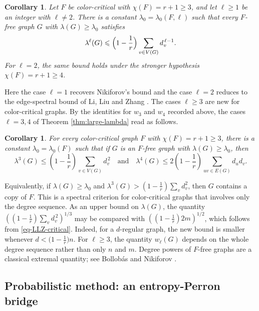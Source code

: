 \documentclass[11pt, a4paper]{article}
\newtheorem{corollary}[theorem]{Corollary}
\theoremstyle{definition}
\theoremstyle{plain}
\renewcommand{\le}{\leqslant}
\renewcommand{\ge}{\geqslant}
\begin{document}
\begin{corollary} \label{coro-spectral-power}
Let $F$ be color-critical with
$\chi (F)=r+1\ge 3$, and let $\ell \ge 1$ be an
integer with $\ell \ne 2$. There is a constant
$\lambda_0=\lambda_0(F,\ell )$ such that every
$F$-free graph $G$ with $\lambda (G)\ge \lambda_0$
satisfies
\[
  \lambda^\ell (G)\le \Bigl(1-\frac{1}{r}\Bigr)
  \sum_{v\in V(G)}d_v^{\,\ell -1}.
\]
 For $\ell =2$, the same bound holds under 
 the stronger hypothesis $\chi (F)=r+1\ge 4$.
\end{corollary}


Here the case $\ell =1$ recovers Nikiforov's bound \cite{Nik2009-critical} and the case $\ell =2$ reduces to 
the edge-spectral bound of Li, Liu and Zhang \cite{LLZ-Critical}. 
The cases $\ell \ge 3$ are new for color-critical graphs.  
By the identities for $w_3$ and $w_4$ recorded above, the cases $\ell =3, 4$ of Theorem \ref{thm:large-lambda} 
read as follows. 

\begin{corollary} \label{coro=3and4}
For every color-critical graph $F$ with
$\chi (F)=r+1\ge 3$, there is a constant
$\lambda_0=\lambda_0(F)$ such that if  $G$ is an $F$-free graph with $\lambda (G)\ge \lambda_0$, then 
\[
  \lambda^3 (G) \le\left(1-\frac1r\right)
    \sum_{v\in V(G)}d_v^{\,2}  \quad 
    \text{and} \quad 
      \lambda^4 (G) \le 2 \left(1-\frac1r\right) 
      \sum_{uv\in E(G)}d_ud_v. \]
\end{corollary}


Equivalently, if $\lambda (G)\ge \lambda_0$ and
$\lambda^3 (G)> \left(1-\frac1r \right)\sum_{v}d_v^2$, then $G$ contains a copy of 
$F$. This is a spectral criterion for color-critical graphs that involves only the degree sequence. 
 As an upper bound on
$\lambda(G)$, the quantity $((1-\frac1r)\sum_v d_v^{\,2})^{1/3}$ may be
compared with $( (1-\frac1r )2m )^{1/2}$, which follows from \eqref{eq-LLZ-critical}. Indeed,  for a $d$-regular graph,  the new bound is smaller
whenever $d<\bigl(1-\frac1r\bigr)n$. For
$\ell \ge 3$, the quantity $w_\ell (G)$ depends on the whole degree sequence rather than
only $n$ and $m$. Degree powers of $F$-free graphs are a classical extremal
quantity; see Bollob\'as and Nikiforov \cite{BN2004,BN2012}. 




\subsection{Probabilistic method: an entropy-Perron bridge}
\end{document}
